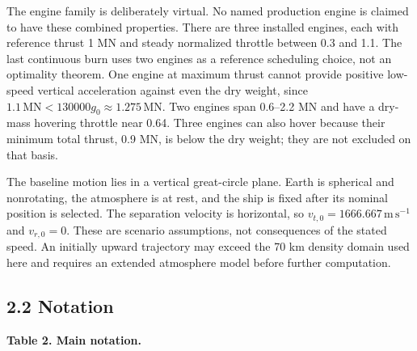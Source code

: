 \documentclass[
  11pt,
  a4paper,
]{article}
\begin{document}
The engine family is deliberately virtual. No named production engine is
claimed to have these combined properties. There are three installed
engines, each with reference thrust 1 MN and steady normalized throttle
between 0.3 and 1.1. The last continuous burn uses two engines as a
reference scheduling choice, not an optimality theorem. One engine at
maximum thrust cannot provide positive low-speed vertical acceleration
against even the dry weight, since
\(1.1\,\mathrm{MN}<130000g_0\approx1.275\,\mathrm{MN}\). Two engines
span 0.6--2.2 MN and have a dry-mass hovering throttle near 0.64. Three
engines can also hover because their minimum total thrust, 0.9 MN, is
below the dry weight; they are not excluded on that basis.

The baseline motion lies in a vertical great-circle plane. Earth is
spherical and nonrotating, the atmosphere is at rest, and the ship is
fixed after its nominal position is selected. The separation velocity is
horizontal, so \(v_{t,0}=1666.667\,\mathrm{m\,s^{-1}}\) and
\(v_{r,0}=0\). These are scenario assumptions, not consequences of the
stated speed. An initially upward trajectory may exceed the 70 km
density domain used here and requires an extended atmosphere model
before further computation.

\subsection{2.2 Notation}\label{notation}

\textbf{Table 2. Main notation.}
\end{document}
